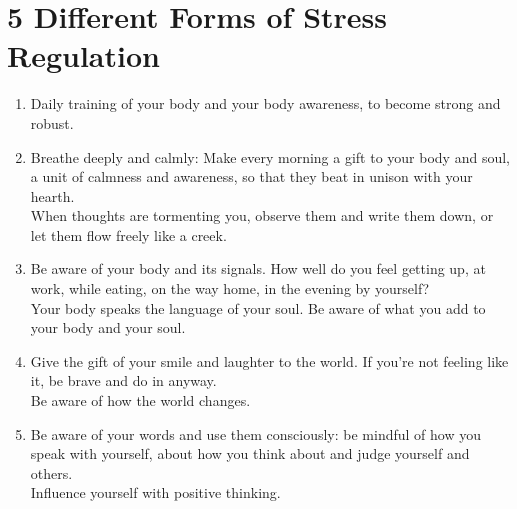 \documentclass[../Book.Stress_regulation.tex]{subfiles}
\begin{document}
\section{5 Different Forms of Stress Regulation}
\begin{enumerate} 
\item  Daily {training of your body} and your body awareness, to become {strong and robust}.
\item {Breathe deeply} and calmly: Make every morning a gift to your body and soul, a unit of calmness and awareness, so that they beat in unison with your hearth.\\
When {thoughts} are tormenting you, observe them and write them down, or let them flow freely like a creek.
\item {Be aware} of your body and its signals. How well do you feel getting up, at work, while eating, on the way home, in the evening by yourself?\\
Your body speaks the {language of your soul}. Be aware of what you add to your body and your soul.
\item Give the {gift of your smile} and laughter to the world. If you're not feeling like it, be brave and do in anyway.\\
Be aware of how the world changes.
\item Be aware of your {words} and use them consciously: be mindful of how you speak with yourself, about how you think about and judge yourself and others.\\
Influence yourself with {positive thinking}. 
\end{enumerate}
\end{document}
